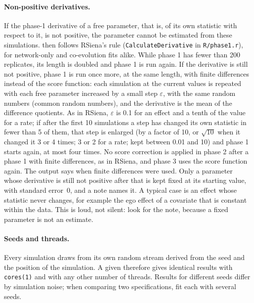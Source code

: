 \paragraph{Non-positive derivatives.}\label{sec:nonposderiv} If the phase-1 derivative of a free parameter, that is, of its own statistic with respect to it, is not positive, the parameter cannot be estimated from these simulations. \nwsaom{} then follows RSiena's rule (\texttt{CalculateDerivative} in \texttt{R/phase1.r}), for network-only and co-evolution fits alike. While phase 1 has fewer than 200 replicates, its length is doubled and phase 1 is run again. If the derivative is still not positive, phase 1 is run once more, at the same length, with finite differences instead of the score function: each simulation at the current values is repeated with each free parameter increased by a small step $\varepsilon$, with the same random numbers (common random numbers), and the derivative is the mean of the difference quotients. As in RSiena, $\varepsilon$ is 0.1 for an effect and a tenth of the value for a rate; if after the first 10 simulations a step has changed its own statistic in fewer than 5 of them, that step is enlarged (by a factor of 10, or $\sqrt{10}$ when it changed it 3 or 4 times; 3 or 2 for a rate; kept between 0.01 and 10) and phase 1 starts again, at most four times. No score correction is applied in phase 2 after a phase 1 with finite differences, as in RSiena, and phase 3 uses the score function again. The output says when finite differences were used. Only a parameter whose derivative is still not positive after that is kept fixed at its starting value, with standard error~0, and a note names it. A typical case is an effect whose statistic never changes, for example the ego effect of a covariate that is constant within the data. This is loud, not silent: look for the note, because a fixed parameter is not an estimate.

\paragraph{Seeds and threads.} Every simulation draws from its own random stream derived from the seed and the position of the simulation. A given  therefore gives identical results with \texttt{cores(1)} and with any other number of threads. Results for different seeds differ by simulation noise; when comparing two specifications, fit each with several seeds.

